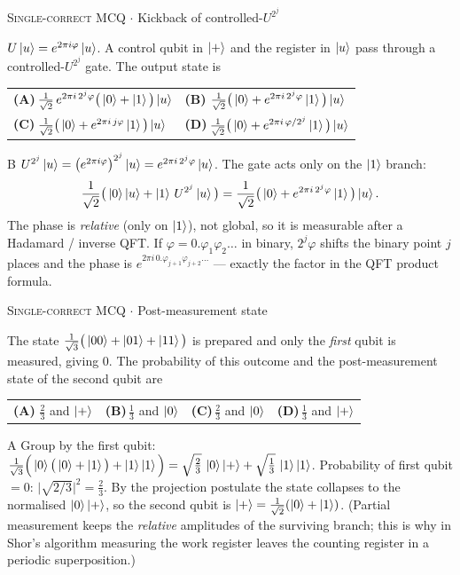 \documentclass[11pt,a4paper]{article}
\newcommand{\optlabel}[1]{\textbf{(#1)}}
\newcommand{\correctlabel}[1]{\textcolor{okgreen}{\textbf{(#1)}\,\ding{51}}}
\newenvironment{qitem}[1]{\begin{list}{}{\setlength{\leftmargin}{3.3em}\setlength{\labelwidth}{3.1em}%
  \setlength{\labelsep}{0.2em}\setlength{\topsep}{3pt}\setlength{\parsep}{3pt}}\item[\textbf{Q.#1}\hfill]}{\end{list}}
\newcommand{\qsep}{\par\vspace{2pt}{\color{black!15}\hrule}\vspace{4pt}}
\newcommand{\qmeta}[2]{{\footnotesize\color{black!60}\textsc{#1} \;$\cdot$\; #2}\par}
\begin{document}
\begin{qitem}{28}
\qmeta{Single-correct MCQ}{Kickback of controlled-$U^{2^j}$}
$U\ket{u} = e^{2\pi i\varphi}\ket{u}$. A control qubit in $\ket{+}$ and the register in $\ket{u}$ pass through a
controlled-$U^{2^j}$ gate. The output state is
\par\smallskip\noindent\begin{tabularx}{\linewidth}{@{}*{2}{L}@{}}
\optlabel{A}\,$\frac{1}{\sqrt2}\,e^{2\pi i\,2^j\varphi}\big(\ket0 + \ket1\big)\ket{u}$ & \correctlabel{B}\,$\frac{1}{\sqrt2}\big(\ket0 + e^{2\pi i\,2^j\varphi}\ket1\big)\ket{u}$ \\[3pt]
\optlabel{C}\,$\frac{1}{\sqrt2}\big(\ket0 + e^{2\pi i\,j\varphi}\ket1\big)\ket{u}$ & \optlabel{D}\,$\frac{1}{\sqrt2}\big(\ket0 + e^{2\pi i\,\varphi/2^j}\ket1\big)\ket{u}$
\end{tabularx}
\end{qitem}
\begin{solbox}{B}
$U^{2^j}\ket{u} = \big(e^{2\pi i\varphi}\big)^{2^j}\ket{u} = e^{2\pi i\,2^j\varphi}\ket{u}$. The gate acts only on the $\ket1$ branch:
\[ \frac{1}{\sqrt2}\big(\ket0\ket u + \ket1\,U^{2^j}\ket u\big) = \frac{1}{\sqrt2}\big(\ket0 + e^{2\pi i\,2^j\varphi}\ket1\big)\ket u. \]
The phase is \emph{relative} (only on $\ket1$), not global, so it is measurable after a Hadamard / inverse QFT. If
$\varphi = 0.\varphi_1\varphi_2\dots$ in binary, $2^j\varphi$ shifts the binary point $j$ places and the phase is
$e^{2\pi i\,0.\varphi_{j+1}\varphi_{j+2}\dots}$ --- exactly the factor in the QFT product formula.
\end{solbox}
\qsep

\begin{qitem}{29}
\qmeta{Single-correct MCQ}{Post-measurement state}
The state $\frac{1}{\sqrt3}\big(\ket{00} + \ket{01} + \ket{11}\big)$ is prepared and only the \emph{first} qubit is
measured, giving $0$. The probability of this outcome and the post-measurement state of the second qubit are
\par\smallskip\noindent\begin{tabularx}{\linewidth}{@{}*{4}{L}@{}}
\correctlabel{A}\,$\frac23$ and $\ket{+}$ & \optlabel{B}\,$\frac13$ and $\ket{0}$ & \optlabel{C}\,$\frac23$ and $\ket{0}$ & \optlabel{D}\,$\frac13$ and $\ket{+}$
\end{tabularx}
\end{qitem}
\begin{solbox}{A}
Group by the first qubit: $\frac{1}{\sqrt3}\Big(\ket0\big(\ket0 + \ket1\big) + \ket1\ket1\Big)
= \sqrt{\tfrac23}\,\ket0\ket{+} + \sqrt{\tfrac13}\,\ket1\ket1$.
Probability of first qubit $= 0$: $\big|\sqrt{2/3}\big|^2 = \frac23$. By the projection postulate the state collapses to the
normalised $\ket{0}\ket{+}$, so the second qubit is $\ket{+} = \frac{1}{\sqrt2}(\ket0 + \ket1)$.
(Partial measurement keeps the \emph{relative} amplitudes of the surviving branch; this is why in Shor's algorithm measuring
the work register leaves the counting register in a periodic superposition.)
\end{solbox}
\qsep
\end{document}
